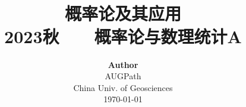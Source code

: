 \title{ \normalsize \textsc{}
		\\ [2.0cm]
		\HRule{1.5pt} \\
		\LARGE \textbf{{概率论及其应用}
		\HRule{2.0pt} \\ [0.6cm] \LARGE{2023秋 ~~~概率论与数理统计A} \vspace*{10\baselineskip}}
		}
\date{}
\author{\textbf{Author} \\ 
		AUGPath \\
		China Univ. of Geosciences \\
		\today}

\maketitle
\newpage

\tableofcontents
\newpage
